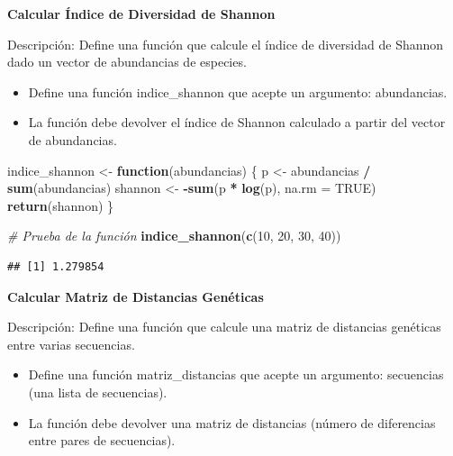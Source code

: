 \documentclass[
]{book}
\newenvironment{Shaded}{\begin{snugshade}}{\end{snugshade}}
\newcommand{\AttributeTok}[1]{\textcolor[rgb]{0.13,0.29,0.53}{#1}}
\newcommand{\CommentTok}[1]{\textcolor[rgb]{0.56,0.35,0.01}{\textit{#1}}}
\newcommand{\ConstantTok}[1]{\textcolor[rgb]{0.56,0.35,0.01}{#1}}
\newcommand{\ControlFlowTok}[1]{\textcolor[rgb]{0.13,0.29,0.53}{\textbf{#1}}}
\newcommand{\DecValTok}[1]{\textcolor[rgb]{0.00,0.00,0.81}{#1}}
\newcommand{\FunctionTok}[1]{\textcolor[rgb]{0.13,0.29,0.53}{\textbf{#1}}}
\newcommand{\NormalTok}[1]{#1}
\newcommand{\OtherTok}[1]{\textcolor[rgb]{0.56,0.35,0.01}{#1}}
\newcommand{\SpecialCharTok}[1]{\textcolor[rgb]{0.81,0.36,0.00}{\textbf{#1}}}
\providecommand{\tightlist}{%
  \setlength{\itemsep}{0pt}\setlength{\parskip}{0pt}}
\begin{document}
\textbf{Calcular Índice de Diversidad de Shannon}

Descripción: Define una función que calcule el índice de diversidad de Shannon dado un vector de abundancias de especies.

\begin{itemize}
\tightlist
\item
  Define una función indice\_shannon que acepte un argumento: abundancias.
\item
  La función debe devolver el índice de Shannon calculado a partir del vector de abundancias.
\end{itemize}

\begin{Shaded}
\begin{Highlighting}[]
\NormalTok{indice\_shannon }\OtherTok{\textless{}{-}} \ControlFlowTok{function}\NormalTok{(abundancias) \{}
\NormalTok{  p }\OtherTok{\textless{}{-}}\NormalTok{ abundancias }\SpecialCharTok{/} \FunctionTok{sum}\NormalTok{(abundancias)}
\NormalTok{  shannon }\OtherTok{\textless{}{-}} \SpecialCharTok{{-}}\FunctionTok{sum}\NormalTok{(p }\SpecialCharTok{*} \FunctionTok{log}\NormalTok{(p), }\AttributeTok{na.rm =} \ConstantTok{TRUE}\NormalTok{)}
  \FunctionTok{return}\NormalTok{(shannon)}
\NormalTok{\}}

\CommentTok{\# Prueba de la función}
\FunctionTok{indice\_shannon}\NormalTok{(}\FunctionTok{c}\NormalTok{(}\DecValTok{10}\NormalTok{, }\DecValTok{20}\NormalTok{, }\DecValTok{30}\NormalTok{, }\DecValTok{40}\NormalTok{))}
\end{Highlighting}
\end{Shaded}

\begin{verbatim}
## [1] 1.279854
\end{verbatim}

\textbf{Calcular Matriz de Distancias Genéticas}

Descripción: Define una función que calcule una matriz de distancias genéticas entre varias secuencias.

\begin{itemize}
\tightlist
\item
  Define una función matriz\_distancias que acepte un argumento: secuencias (una lista de secuencias).
\item
  La función debe devolver una matriz de distancias (número de diferencias entre pares de secuencias).
\end{itemize}
\end{document}
